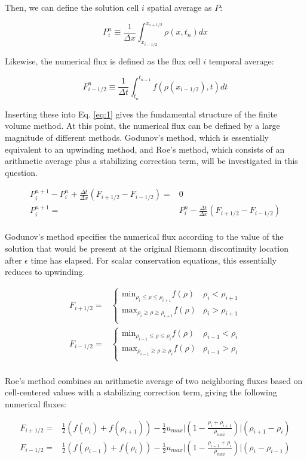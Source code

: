 \documentclass[10pt]{article}
\newcommand{\beq}{\begin{equation}}
\newcommand{\eeq}{\end{equation}}
\newcommand{\beqa}{\begin{equation}\begin{aligned}}
\newcommand{\eeqa}{\end{aligned}\end{equation}}
\begin{document}
Then, we can define the solution cell \(i\) spatial average as \(P\):

\beq
P_i^{n}\equiv\frac{1}{\Delta x}\int_{x_{i-1/2}}^{x_{i+1/2}}\rho(x, t_{n}) dx
\eeq

Likewise, the numerical flux is defined as the flux cell \(i\) temporal average:

\beq
F_{i-1/2}^n\equiv\frac{1}{\Delta t}\int_{t_n}^{t_{n+1}}f(\rho(x_{i-1/2}),t)dt
\eeq

Inserting these into Eq. \eqref{eq:1} gives the fundamental structure of the finite volume method. At this point, the numerical flux can be defined by a large magnitude of different methods. Godunov's method, which is essentially equivalent to an upwinding method, and Roe's method, which consists of an arithmetic average plus a stabilizing correction term, will be investigated in this question.

\beqa
P_i^{n+1}-P_i^n+\frac{\Delta t}{\Delta x}\left(F_{i+1/2}-F_{i-1/2}\right)=&0\\
P_i^{n+1}=&P_i^n-\frac{\Delta t}{\Delta x}\left(F_{i+1/2}-F_{i-1/2}\right)\\
\eeqa

Godunov's method specifies the numerical flux according to the value of the solution that would be present at the original Riemann discontinuity location after \(\epsilon\) time has elapsed. For scalar conservation equations, this essentially reduces to upwinding. 

\beqa
F_{i+1/2}=&\begin{cases}\textrm{min}_{\rho_i\leq\rho\leq\rho_{i+1}}f(\rho) & \rho_i < \rho_{i+1}\\
\textrm{max}_{\rho_i\geq\rho\geq\rho_{i+1}}f(\rho) & \rho_i>\rho_{i+1}\\
\end{cases}\\
F_{i-1/2}=&\begin{cases}\textrm{min}_{\rho_{i-1}\leq\rho\leq\rho_{i}}f(\rho) & \rho_{i-1} < \rho_{i}\\
\textrm{max}_{\rho_{i-1}\geq\rho\geq\rho_{i}}f(\rho) & \rho_{i-1}>\rho_{i}\\
\end{cases}\\
\eeqa

Roe's method combines an arithmetic average of two neighboring fluxes based on cell-centered values with a stabilizing correction term, giving the following numerical fluxes:

\beqa
F_{i+1/2}=&\frac{1}{2}\left(f(\rho_i)+f(\rho_{i+1})\right)-\frac{1}{2}u_{max}\biggr\lvert\left(1-\frac{\rho_i+\rho_{i+1}}{\rho_{max}}\right)\biggr\rvert(\rho_{i+1}-\rho_{i})\\
F_{i-1/2}=&\frac{1}{2}\left(f(\rho_{i-1})+f(\rho_{i})\right)-\frac{1}{2}u_{max}\biggr\lvert\left(1-\frac{\rho_{i-1}+\rho_{i}}{\rho_{max}}\right)\biggr\rvert(\rho_{i}-\rho_{i-1})\\
\eeqa
\end{document}
